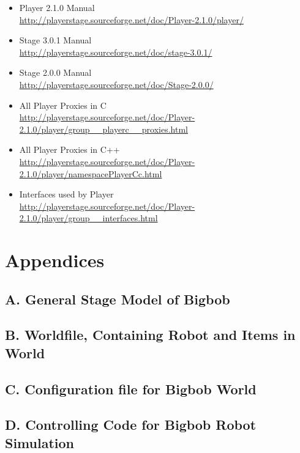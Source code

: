 \documentclass[a4paper]{report}
\begin{document}
\begin{itemize}

\item Player 2.1.0 Manual \\
\url{http://playerstage.sourceforge.net/doc/Player-2.1.0/player/}

\item Stage 3.0.1 Manual \\
\url{http://playerstage.sourceforge.net/doc/stage-3.0.1/}

\item Stage 2.0.0 Manual\\
\url{http://playerstage.sourceforge.net/doc/Stage-2.0.0/}

\item All Player Proxies in C\\
\url{http://playerstage.sourceforge.net/doc/Player-2.1.0/player/group__playerc__proxies.html}

\item All Player Proxies in C++\\
\url{http://playerstage.sourceforge.net/doc/Player-2.1.0/player/namespacePlayerCc.html}

\item Interfaces used by Player\\
\url{http://playerstage.sourceforge.net/doc/Player-2.1.0/player/group__interfaces.html}
\end{itemize}





 



\chapter{Appendices}

\section{A. General Stage Model of Bigbob}\label{app:Abigbob.inc}


\section{B. Worldfile, Containing Robot and Items in World}\label{app:Brobotsjunkworld}


\section{C. Configuration file for Bigbob World}\label{app:Cconfig}


\section{D. Controlling Code for Bigbob Robot Simulation}\label{app:Dbigbobcode}

\end{document}
